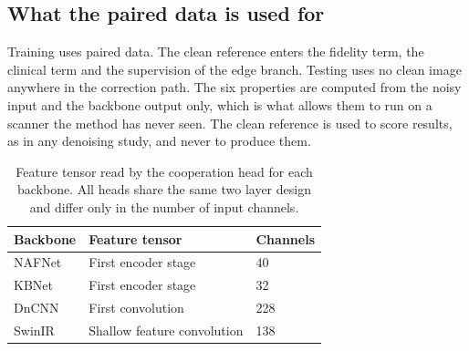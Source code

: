 \subsection{What the paired data is used for}
Training uses paired data. The clean reference enters the fidelity term, the clinical term and the
supervision of the edge branch. Testing uses no clean image anywhere in the correction path. The six
properties are computed from the noisy input and the backbone output only, which is what allows them
to run on a scanner the method has never seen. The clean reference is used to score results, as in
any denoising study, and never to produce them.

\begin{table}[!tb]
\centering
\caption{Feature tensor read by the cooperation head for each backbone. All heads share the same two
layer design and differ only in the number of input channels.}
\label{tab:supp_uncertainty_sources}
\setlength{\tabcolsep}{4pt}
\footnotesize
\begin{tabular}{lll}
\toprule
Backbone & Feature tensor & Channels \\
\midrule
NAFNet & First encoder stage & 40 \\
KBNet & First encoder stage & 32 \\
DnCNN & First convolution & 228 \\
SwinIR & Shallow feature convolution & 138 \\
\bottomrule
\end{tabular}
\end{table}
